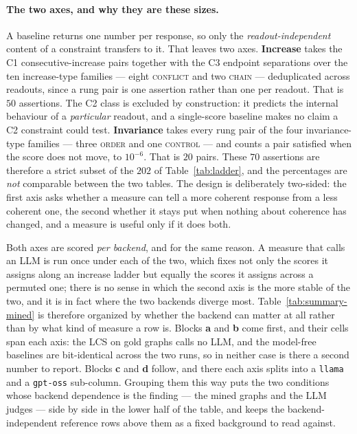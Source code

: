 \paragraph{The two axes, and why they are these sizes.} A baseline returns one number per response, so
only the \emph{readout-independent} content of a constraint transfers to it. That leaves two axes.
\textbf{Increase} takes the C1 consecutive-increase pairs together with the C3 endpoint separations over the
ten increase-type families --- eight \textsc{conflict} and two \textsc{chain} --- deduplicated across
readouts, since a rung pair is one assertion rather than one per readout. That is $50$ assertions. The C2
class is excluded by construction: it predicts the internal behaviour of a \emph{particular} readout, and a
single-score baseline makes no claim a C2 constraint could test. \textbf{Invariance} takes every rung pair of
the four invariance-type families --- three \textsc{order} and one \textsc{control} --- and counts a pair
satisfied when the score does not move, to $10^{-6}$. That is $20$ pairs. These $70$ assertions are therefore
a strict subset of the $202$ of Table~\ref{tab:ladder}, and the percentages are \emph{not} comparable between
the two tables. The design is deliberately two-sided: the first axis asks whether a measure can tell a more
coherent response from a less coherent one, the second whether it stays put when nothing about coherence has
changed, and a measure is useful only if it does both.

Both axes are scored \emph{per backend}, and for the same reason. A measure that calls an LLM is run once
under each of the two, which fixes not only the scores it assigns along an increase ladder but equally the
scores it assigns across a permuted one; there is no sense in which the second axis is the more stable of
the two, and it is in fact where the two backends diverge most. Table~\ref{tab:summary-mined} is therefore
organized by whether the backend can matter at all rather than by what kind of measure a row is. Blocks
\textbf{a} and \textbf{b} come first, and their cells span each axis: the LCS on gold graphs calls no LLM,
and the model-free baselines are bit-identical across the two runs, so in neither case is there a second
number to report. Blocks \textbf{c} and \textbf{d} follow, and there each axis splits into a \texttt{llama}
and a \texttt{gpt-oss} sub-column. Grouping them this way puts the two conditions whose backend dependence
is the finding --- the mined graphs and the LLM judges --- side by side in the lower half of the table, and
keeps the backend-independent reference rows above them as a fixed background to read against.

